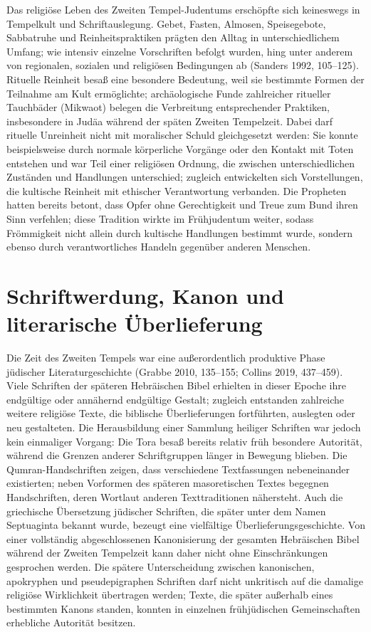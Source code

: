 \documentclass[fontsize=12pt]{mybib}
\begin{document}
Das religiöse Leben des Zweiten Tempel-Judentums erschöpfte sich keineswegs in Tempelkult und Schriftauslegung. Gebet, Fasten, Almosen, Speisegebote, Sabbatruhe und Reinheitspraktiken prägten den Alltag in unterschiedlichem Umfang; wie intensiv einzelne Vorschriften befolgt wurden, hing unter anderem von regionalen, sozialen und religiösen Bedingungen ab (Sanders 1992, 105–125). Rituelle Reinheit besaß eine besondere Bedeutung, weil sie bestimmte Formen der Teilnahme am Kult ermöglichte; archäologische Funde zahlreicher ritueller Tauchbäder (Mikwaot) belegen die Verbreitung entsprechender Praktiken, insbesondere in Judäa während der späten Zweiten Tempelzeit. Dabei darf rituelle Unreinheit nicht mit moralischer Schuld gleichgesetzt werden: Sie konnte beispielsweise durch normale körperliche Vorgänge oder den Kontakt mit Toten entstehen und war Teil einer religiösen Ordnung, die zwischen unterschiedlichen Zuständen und Handlungen unterschied; zugleich entwickelten sich Vorstellungen, die kultische Reinheit mit ethischer Verantwortung verbanden. Die Propheten hatten bereits betont, dass Opfer ohne Gerechtigkeit und Treue zum Bund ihren Sinn verfehlen; diese Tradition wirkte im Frühjudentum weiter, sodass Frömmigkeit nicht allein durch kultische Handlungen bestimmt wurde, sondern ebenso durch verantwortliches Handeln gegenüber anderen Menschen.

\section{Schriftwerdung, Kanon und literarische Überlieferung}

Die Zeit des Zweiten Tempels war eine außerordentlich produktive Phase jüdischer Literaturgeschichte (Grabbe 2010, 135–155; Collins 2019, 437–459). Viele Schriften der späteren Hebräischen Bibel erhielten in dieser Epoche ihre endgültige oder annähernd endgültige Gestalt; zugleich entstanden zahlreiche weitere religiöse Texte, die biblische Überlieferungen fortführten, auslegten oder neu gestalteten. Die Herausbildung einer Sammlung heiliger Schriften war jedoch kein einmaliger Vorgang: Die Tora besaß bereits relativ früh besondere Autorität, während die Grenzen anderer Schriftgruppen länger in Bewegung blieben. Die Qumran-Handschriften zeigen, dass verschiedene Textfassungen nebeneinander existierten; neben Vorformen des späteren masoretischen Textes begegnen Handschriften, deren Wortlaut anderen Texttraditionen nähersteht. Auch die griechische Übersetzung jüdischer Schriften, die später unter dem Namen Septuaginta bekannt wurde, bezeugt eine vielfältige Überlieferungsgeschichte. Von einer vollständig abgeschlossenen Kanonisierung der gesamten Hebräischen Bibel während der Zweiten Tempelzeit kann daher nicht ohne Einschränkungen gesprochen werden. Die spätere Unterscheidung zwischen kanonischen, apokryphen und pseudepigraphen Schriften darf nicht unkritisch auf die damalige religiöse Wirklichkeit übertragen werden; Texte, die später außerhalb eines bestimmten Kanons standen, konnten in einzelnen frühjüdischen Gemeinschaften erhebliche Autorität besitzen.
\end{document}
